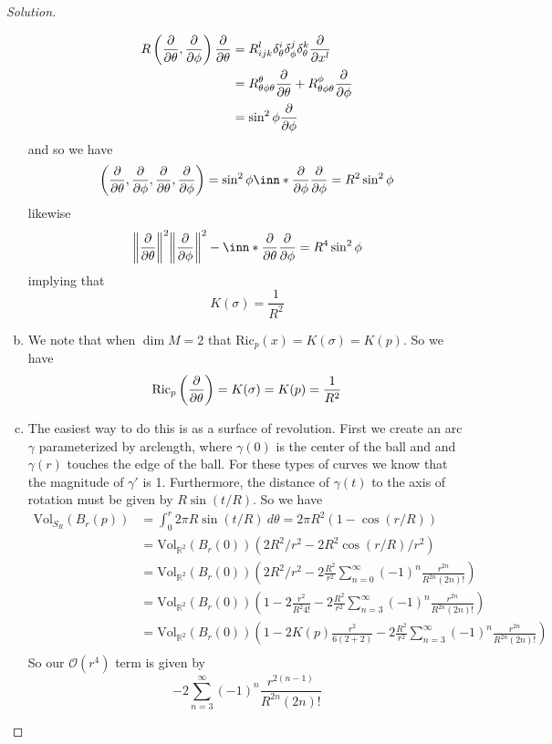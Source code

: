 \documentclass[a4paper]{article}
\begin{document}
\begin{proof}[Solution]
\begin{enumerate}[(a)]
  \[
    \begin{aligned}
      R \left(\pdv{\theta}, \pdv{\phi} \right)\pdv{\theta} &= R_{ijk}^l \delta^{i}_\theta \delta^j_\phi \delta^k_\theta \pdv{x^l}\\
                                                           &= R_{\theta \phi \theta}^\theta \pdv{\theta} + R_{\theta \phi \theta}^\phi \pdv{\phi} \\
                                                           &= \sin^2 \phi \pdv{\phi}
    \end{aligned}
  \]
  and so we have
  \[
    \left( \pdv{\theta}, \pdv{\phi}, \pdv{\theta}, \pdv{\phi} \right) = \sin^2 \phi \inn*{\pdv{\phi}}{\pdv{\phi}} = R^2 \sin^2 \phi
  \]
  likewise
  \[
    \norm{\pdv{\theta}}^2 \norm{\pdv{\phi}}^2 - \inn*{\pdv{\theta}}{\pdv{\phi}} = R^4 \sin^2 \phi
  \]
  implying that
  \[
    K(\sigma) = \frac{1}{R^2}
  \]
\item We note that when $\dim M = 2$ that $\text{Ric}_p(x) = K(\sigma) = K(p)$. So we have
  \[
    \text{Ric}_p \left( \pdv{\theta} \right) = K(\sigma) = K(p) = \frac{1}{R^2}
  \]
\item The easiest way to do this is as a surface of revolution. First we create an arc $\gamma$ parameterized by arclength, where $\gamma(0)$ is the center of the ball and and $\gamma(r)$ touches the edge of the ball. For these types of curves we know that the magnitude of $\gamma'$ is 1. Furthermore, the distance of $\gamma(t)$ to the axis of rotation must be given by $R\sin(t/R)$. So we have
  \[
    \begin{aligned}
      \text{Vol}_{S_R}(B_r(p)) &= \int_0^{r} 2\pi R \sin(t/R) \ d\theta = 2\pi R^2 \left( 1 - \cos(r/R) \right) \\
    &= \text{Vol}_{\mathds{R}^2}(B_r(0)) \left( 2R^2/r^2 - 2R^2\cos(r/R)/r^2 \right) \\
    &= \text{Vol}_{\mathds{R}^2}(B_r(0)) \left( 2R^2/r^2 - 2\frac{R^2}{r^2}\sum_{n=0}^{\infty} (-1)^n \frac{r^{2n}}{R^{2n} (2n)!} \right) \\
    &= \text{Vol}_{\mathds{R}^2}(B_r(0)) \left( 1 - 2\frac{r^2}{R^2 4!} - 2\frac{R^2}{r^2}\sum_{n=3}^{\infty} (-1)^n \frac{r^{2n}}{R^{2n} (2n)!} \right) \\
    &= \text{Vol}_{\mathds{R}^2}(B_r(0)) \left( 1 - 2K(p)\frac{r^2}{6(2 + 2)} - 2\frac{R^2}{r^2}\sum_{n=3}^{\infty} (-1)^n \frac{r^{2n}}{R^{2n} (2n)!} \right) \\
    \end{aligned}
  \]
  So our $\mathcal{O}(r^4)$ term is given by
  \[
    -2 \sum_{n=3}^{\infty} (-1)^n \frac{r^{2(n-1)}}{R^{2n}(2n)!}
  \]
  \end{enumerate}
\end{proof}
\end{document}
